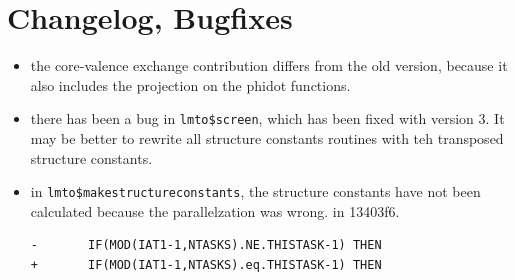 \documentclass[11pt,a4paper]{report}
\begin{document}
\chapter{Changelog, Bugfixes}
\begin{itemize}
%
\item the core-valence exchange contribution differs from the old version,
  because it also includes the projection on the phidot functions.
%
\item there has been a bug in \verb|lmto$screen|, which has been fixed
  with version 3. It may be better to rewrite all structure constants
  routines with teh transposed structure constants.
%
\item in \verb|lmto$makestructureconstants|, the structure constants
  have not been calculated because the parallelzation was wrong.  in
  13403f6.
\begin{verbatim}
-       IF(MOD(IAT1-1,NTASKS).NE.THISTASK-1) THEN
+       IF(MOD(IAT1-1,NTASKS).eq.THISTASK-1) THEN
\end{verbatim}
%
\end{itemize}


\clearpage
 
\end{document}
